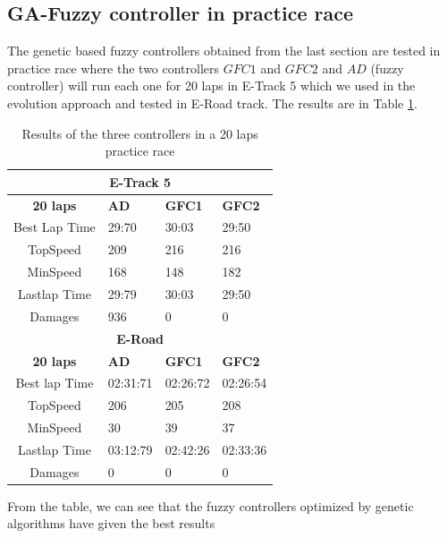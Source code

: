 \documentclass[runningheads,a4paper]{llncs}
\begin{document}
\subsection{GA-Fuzzy  controller in practice race} 
The genetic based fuzzy controllers obtained from the last section are tested in practice race where the two controllers $GFC1$ and $GFC2$ and $AD$ (fuzzy controller) will run each one for 20 laps in E-Track 5 which we used in the evolution approach and tested in E-Road track. The results are in Table \ref{resultat20}.
\begin{table}[!ht]
	\centering
	\caption{Results of the three controllers in a 20 laps practice race}
	\label{resultat20}
	\begin{tabular}{|c|p{2.75 cm}|p{2.75cm}|p{2.75cm}}
		\hline
		\multicolumn{4}{|c|}{{\large \textbf{E-Track 5}}}  \\ \hline
		\hline \textbf{20 laps} & \textbf{AD} & \textbf{GFC1} & \textbf{GFC2}  \\
		\hline Best Lap Time         & 29:70 & 30:03 & 29:50 \\
		\hline TopSpeed          & 209 & 216 & 216\\
		\hline MinSpeed          & 168 & 148 & 182 \\
		\hline Lastlap Time       & 29:79 &  30:03 & 29:50\\
		\hline Damages          & 936 & 0 & 0\\
		\hline
		\multicolumn{4}{|c|}{{\large \textbf{E-Road}}}  \\ \hline
		\hline \textbf{20 laps} & \textbf{AD} & \textbf{GFC1} & \textbf{GFC2}  \\
		\hline Best lap Time         & 02:31:71    & 02:26:72       & 02:26:54  \\
		\hline TopSpeed          & 206         & 205            &  208 \\
		\hline MinSpeed          & 30          & 39             & 37  \\
		\hline Lastlap Time       & 03:12:79    &  02:42:26      &  02:33:36 \\
		\hline Damages          &   0         & 0              & 0  \\
		\hline 
	\end{tabular}
\end{table}
From the table, we can see that the fuzzy controllers optimized by genetic algorithms have given the best results
\end{document}
